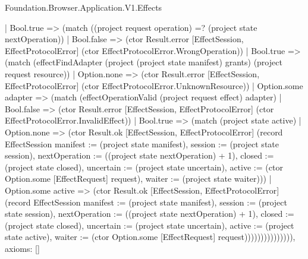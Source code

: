 \begin{lexlean}{Foundation.Browser.Application.V1.Effects}
\begin{semanticmodule}
{                  | Bool.true => (match ((project request operation) =? (project state nextOperation))
                    | Bool.false => (ctor Result.error [EffectSession, EffectProtocolError] (ctor EffectProtocolError.WrongOperation))
                    | Bool.true => (match (effectFindAdapter (project (project state manifest) grants) (project request resource))
                      | Option.none => (ctor Result.error [EffectSession, EffectProtocolError] (ctor EffectProtocolError.UnknownResource))
                      | Option.some adapter => (match (effectOperationValid (project request effect) adapter)
                        | Bool.false => (ctor Result.error [EffectSession, EffectProtocolError] (ctor EffectProtocolError.InvalidEffect))
                        | Bool.true => (match (project state active)
                          | Option.none => (ctor Result.ok [EffectSession, EffectProtocolError] (record EffectSession {manifest := (project state manifest), session := (project state session), nextOperation := ((project state nextOperation) + 1), closed := (project state closed), uncertain := (project state uncertain), active := (ctor Option.some [EffectRequest] request), waiter := (project state waiter)}))
                          | Option.some active => (ctor Result.ok [EffectSession, EffectProtocolError] (record EffectSession {manifest := (project state manifest), session := (project state session), nextOperation := ((project state nextOperation) + 1), closed := (project state closed), uncertain := (project state uncertain), active := (project state active), waiter := (ctor Option.some [EffectRequest] request)})))))))))))))),
  axioms: []
}


\end{semanticmodule}
\end{lexlean}
